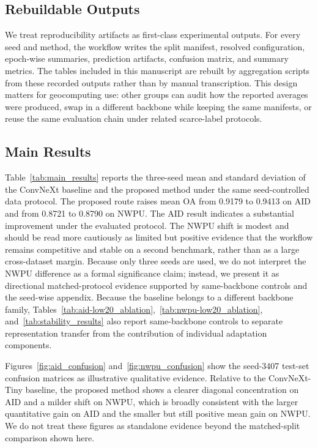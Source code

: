 \subsection{Rebuildable Outputs}

We treat reproducibility artifacts as first-class experimental outputs. For every seed and method, the workflow writes the split manifest, resolved configuration, epoch-wise summaries, prediction artifacts, confusion matrix, and summary metrics. The tables included in this manuscript are rebuilt by aggregation scripts from these recorded outputs rather than by manual transcription. This design matters for geocomputing use: other groups can audit how the reported averages were produced, swap in a different backbone while keeping the same manifests, or reuse the same evaluation chain under related scarce-label protocols.

\subsection{Main Results}

Table~\ref{tab:main_results} reports the three-seed mean and standard deviation of the ConvNeXt baseline and the proposed method under the same seed-controlled data protocol. The proposed route raises mean OA from 0.9179 to 0.9413 on AID and from 0.8721 to 0.8790 on NWPU. The AID result indicates a substantial improvement under the evaluated protocol. The NWPU shift is modest and should be read more cautiously as limited but positive evidence that the workflow remains competitive and stable on a second benchmark, rather than as a large cross-dataset margin. Because only three seeds are used, we do not interpret the NWPU difference as a formal significance claim; instead, we present it as directional matched-protocol evidence supported by same-backbone controls and the seed-wise appendix. Because the baseline belongs to a different backbone family, Tables~\ref{tab:aid-low20_ablation},~\ref{tab:nwpu-low20_ablation}, and~\ref{tab:stability_results} also report same-backbone controls to separate representation transfer from the contribution of individual adaptation components.



Figures~\ref{fig:aid_confusion} and~\ref{fig:nwpu_confusion} show the seed-3407 test-set confusion matrices as illustrative qualitative evidence. Relative to the ConvNeXt-Tiny baseline, the proposed method shows a clearer diagonal concentration on AID and a milder shift on NWPU, which is broadly consistent with the larger quantitative gain on AID and the smaller but still positive mean gain on NWPU. We do not treat these figures as standalone evidence beyond the matched-split comparison shown here.

